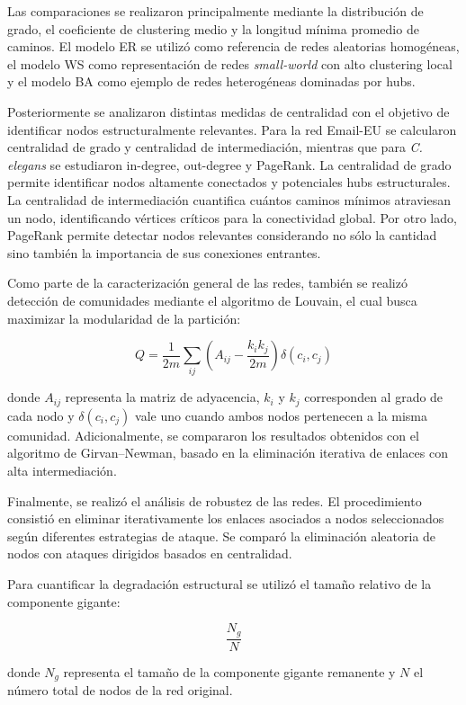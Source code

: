 Las comparaciones se realizaron principalmente mediante la distribución de grado, el coeficiente de clustering medio y la longitud mínima promedio de caminos. El modelo ER se utilizó como referencia de redes aleatorias homogéneas, el modelo WS como representación de redes \textit{small-world} con alto clustering local y el modelo BA como ejemplo de redes heterogéneas dominadas por hubs.

Posteriormente se analizaron distintas medidas de centralidad con el objetivo de identificar nodos estructuralmente relevantes. Para la red Email-EU se calcularon centralidad de grado y centralidad de intermediación, mientras que para \textit{C. elegans} se estudiaron in-degree, out-degree y PageRank. La centralidad de grado permite identificar nodos altamente conectados y potenciales hubs estructurales. La centralidad de intermediación cuantifica cuántos caminos mínimos atraviesan un nodo, identificando vértices críticos para la conectividad global. Por otro lado, PageRank permite detectar nodos relevantes considerando no sólo la cantidad sino también la importancia de sus conexiones entrantes.

Como parte de la caracterización general de las redes, también se realizó detección de comunidades mediante el algoritmo de Louvain, el cual busca maximizar la modularidad de la partición:

\[
Q = \frac{1}{2m}\sum_{ij}\left(A_{ij} - \frac{k_i k_j}{2m}\right)\delta(c_i,c_j)
\]

donde \(A_{ij}\) representa la matriz de adyacencia, \(k_i\) y \(k_j\) corresponden al grado de cada nodo y \(\delta(c_i,c_j)\) vale uno cuando ambos nodos pertenecen a la misma comunidad. Adicionalmente, se compararon los resultados obtenidos con el algoritmo de Girvan--Newman, basado en la eliminación iterativa de enlaces con alta intermediación.

Finalmente, se realizó el análisis de robustez de las redes. El procedimiento consistió en eliminar iterativamente los enlaces asociados a nodos seleccionados según diferentes estrategias de ataque. Se comparó la eliminación aleatoria de nodos con ataques dirigidos basados en centralidad.

Para cuantificar la degradación estructural se utilizó el tamaño relativo de la componente gigante:

\[
\frac{N_g}{N}
\]

donde \(N_g\) representa el tamaño de la componente gigante remanente y \(N\) el número total de nodos de la red original.

